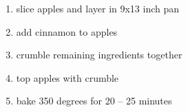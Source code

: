 \documentclass[letter]{recipe}
\begin{document}

\begin{enumerate}
\addtolength{\itemindent}{2em}
 \item slice apples and layer in 9x13 inch pan
 \item add cinnamon to apples
 \item crumble remaining ingredients together
 \item top apples with crumble
 \item bake 350 degrees for 20 -- 25 minutes
\end{enumerate}
\end{document}
